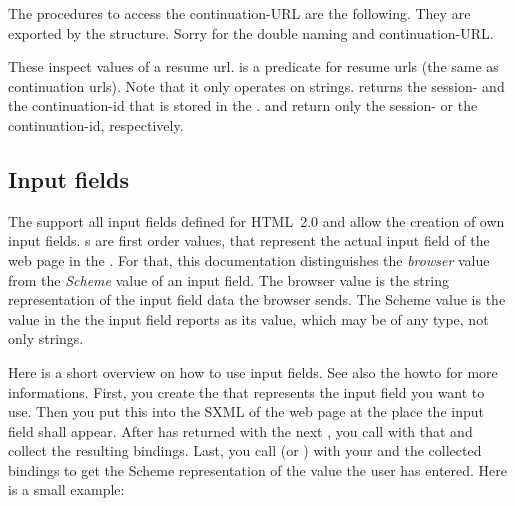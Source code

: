 The procedures to access the continuation-URL are the following.  They
are exported by the  structure.  Sorry
for the double naming  and continuation-URL.

\begin{desc}
  These inspect values of a resume url.   is a
  predicate for resume urls (the same as continuation urls).  Note
  that it only operates on strings.   returns the
  session- and the continuation-id that is stored in the
  .   and
   return only the session- or the
  continuation-id, respectively.
\end{desc}



\subsection{Input fields}

The \surflets support all input fields defined for HTML~2.0 and allow
  the creation of own input fields.  s are first order
  values, that represent the actual input field of the web page in the
  \surflet.  For that, this documentation distinguishes the
  \emph{browser} value from the \emph{Scheme} value of an input field.
  The browser value is the string representation of the input field
  data the browser sends.  The Scheme value is the value in the
  \surflet the input field reports as its value, which may be of any
  type, not only strings.

  Here is a short overview on how to use input fields.  See also the
  howto for more informations.  First, you create the 
  that represents the input field you want to use.  Then you put this
   into the SXML of the web page at the place the
  input field shall appear.  After  has returned
  with the next , you call  with
  that  and collect the resulting bindings.  Last,
  you call  (or ) with
  your  and the collected bindings to get the Scheme
  representation of the value the user has entered.  Here is a small
  example:

